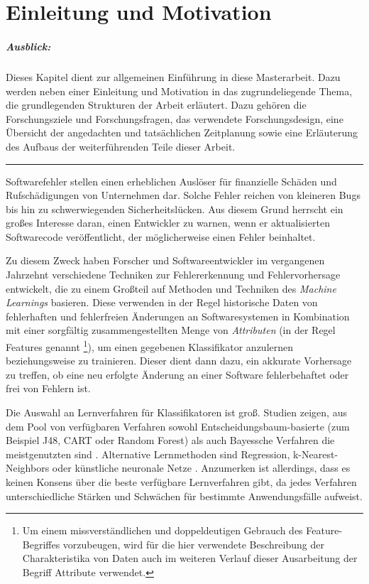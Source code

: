 
\chapter{Einleitung und Motivation}

\paragraph{Ausblick:}
Dieses Kapitel dient zur allgemeinen Einführung in diese Masterarbeit. Dazu werden neben einer Einleitung und Motivation in das zugrundeliegende Thema, die grundlegenden Strukturen der Arbeit erläutert. Dazu gehören die Forschungsziele und Forschungsfragen, das verwendete Forschungsdesign, eine Übersicht der angedachten und tatsächlichen Zeitplanung sowie eine Erläuterung des Aufbaus der weiterführenden Teile dieser Arbeit.
\\
\hrule

Softwarefehler stellen einen erheblichen Auslöser für finanzielle Schäden und Rufschädigungen von Unternehmen dar. Solche Fehler reichen von kleineren \glqq Bugs\grqq{} bis hin zu schwerwiegenden Sicherheitslücken. Aus diesem Grund herrscht ein großes Interesse daran, einen Entwickler zu warnen, wenn er aktualisierten Softwarecode veröffentlicht, der möglicherweise einen Fehler beinhaltet. 

Zu diesem Zweck haben Forscher und Softwareentwickler im vergangenen Jahrzehnt verschiedene Techniken zur Fehlererkennung und Fehlervorhersage entwickelt, die zu einem Großteil auf Methoden und Techniken des \emph{Machine Learnings} basieren. Diese verwenden in der Regel historische Daten von fehlerhaften und fehlerfreien Änderungen an Softwaresystemen in Kombination mit einer sorgfältig zusammengestellten Menge von \emph{Attributen} (in der Regel Features genannt \footnote{Um einem missverständlichen und doppeldeutigen Gebrauch des Feature-Begriffes vorzubeugen, wird für die hier verwendete Beschreibung der Charakteristika von Daten auch im weiteren Verlauf dieser Ausarbeitung der Begriff \glqq Attribute\grqq{} verwendet.}), um einen gegebenen Klassifikator anzulernen beziehungsweise zu trainieren. Dieser dient dann dazu, ein akkurate Vorhersage zu treffen, ob eine neu erfolgte Änderung an einer Software fehlerbehaftet oder frei von Fehlern ist.

Die Auswahl an Lernverfahren für Klassifikatoren ist groß. Studien zeigen, aus dem Pool von verfügbaren Verfahren sowohl Entscheidungsbaum-basierte (zum Beispiel J48, CART oder Random Forest) als auch Bayessche Verfahren die meistgenutzten sind \cite{Son2019}. Alternative Lernmethoden sind Regression, k-Nearest-Neighbors oder künstliche neuronale Netze \cite{Challagulla2008}. Anzumerken ist allerdings, dass es keinen Konsens über die beste verfügbare Lernverfahren gibt, da jedes Verfahren unterschiedliche Stärken und Schwächen für bestimmte Anwendungsfälle aufweist.

